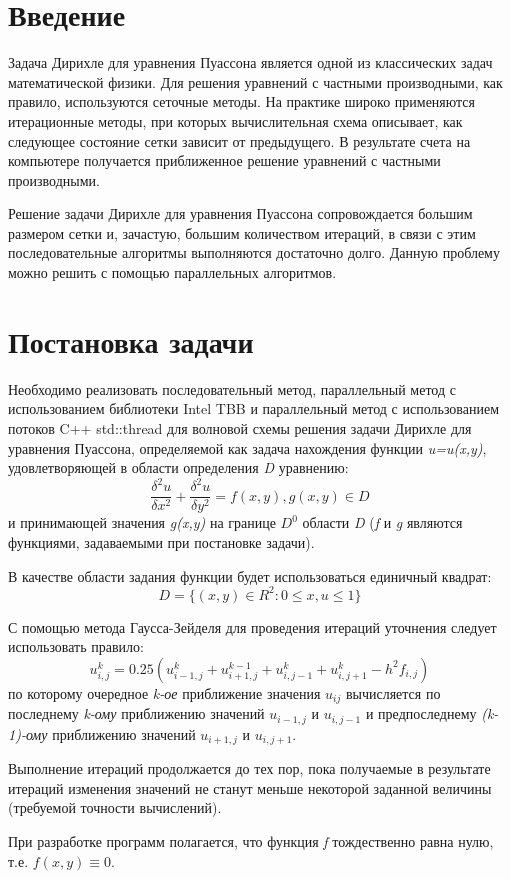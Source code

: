 \documentclass{report}
\begin{document}
\setcounter{page}{2}
\tableofcontents
\newpage

\section*{Введение}
\par Задача Дирихле для уравнения Пуассона является одной из классических задач математической физики. Для решения уравнений с частными производными, как правило, используются сеточные методы. На практике широко применяются итерационные методы, при которых вычислительная схема описывает, как следующее состояние сетки зависит от предыдущего. В результате счета на компьютере получается приближенное решение уравнений с частными производными.
\par Решение задачи Дирихле для уравнения Пуассона сопровождается большим размером сетки и, зачастую, большим количеством итераций, в связи с этим последовательные алгоритмы выполняются достаточно долго. Данную проблему можно решить с помощью параллельных алгоритмов.
\newpage

\section*{Постановка задачи}
\par Необходимо реализовать последовательный метод, параллельный метод с использованием библиотеки Intel TBB и параллельный метод с использованием потоков C++ std::thread для волновой схемы решения задачи Дирихле для уравнения Пуассона, определяемой как задача нахождения функции {\textit{u=u(x,y)}}, удовлетворяющей в области определения {\textit{D}} уравнению: {\large $$\frac{\delta^{2}u}{\delta x^{2}} + \frac{\delta^{2}u}{\delta y^{2}} = f(x,y), g(x,y) \in D $$}и принимающей значения {\textit{g(x,y)}} на границе {\textit{$D^{0}$}} области {\textit{D}} ({\textit{f}} и {\textit{g}} являются функциями, задаваемыми при постановке задачи).
\par В качестве области задания функции будет использоваться единичный квадрат: {\large $$D = \{(x, y) \in R^{2} : 0 \leq x, u \leq 1\}$$}

\par С помощью метода Гаусса-Зейделя для проведения итераций уточнения следует использовать правило: {\large $${u^{k}_{i,j} = 0.25(u^{k}_{i-1,j} + u^{k-1}_{i+1,j} + u^{k}_{i,j-1} + u^{k}_{i,j+1} - h^{2}f_{i,j})}$$}по которому очередное {\textit{k-ое}} приближение значения {\textit{$u_{ij}$}} вычисляется по последнему {\textit{k-ому}} приближению значений {\textit{$u_{i-1,j}$}} и {\textit{$u_{i,j-1}$}} и предпоследнему {\textit{(k-1)-ому}} приближению значений  {\textit{$u_{i+1,j}$}} и {\textit{$u_{i,j+1}$}}.
\par Выполнение итераций продолжается до тех пор, пока получаемые в результате итераций изменения значений
не станут меньше некоторой заданной величины (требуемой точности вычислений).
\par При разработке программ полагается, что функция {\textit{f}} тождественно равна нулю, т.е. $ {f(x,y) \equiv 0} $.
\end{document}
